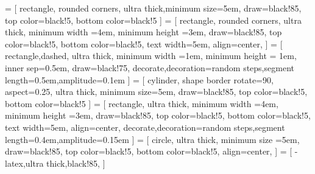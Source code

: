 \documentclass[utf8x,14pt]{extarticle}
\begin{document}
\sf\normalsize
{} = [
    rectangle, rounded corners,
    ultra thick,minimum size=5em,
    draw=black!85,
    top color=black!5,
    bottom color=black!5
]
 = [
    rectangle, rounded corners,
    ultra thick,
    minimum width =4em,
    minimum height =3em,
    draw=black!85,
    top color=black!5,
    bottom color=black!5,
    text width=5em,
    align=center,
]
 = [
    rectangle,dashed,
    ultra thick,
    minimum width =1em,
    minimum height = 1em,
    inner sep=0.5em,
    draw=black!75,
    decorate,decoration={random steps,segment length=0.5em,amplitude=0.1em}
]
 = [
    cylinder,  shape border rotate=90,
    aspect=0.25,
    ultra thick,
    minimum size=5em,
    draw=black!85,
    top color=black!5,
    bottom color=black!5
]
 = [
    rectangle,
    ultra thick,
    minimum width =4em,
    minimum height =3em,
    draw=black!85,
    top color=black!5,
    bottom color=black!5,
    text width=5em,
    align=center,
    decorate,decoration={random steps,segment length=0.4em,amplitude=0.15em}
]
 = [
    circle,
    ultra thick,
    minimum size =5em,
    draw=black!85,
    top color=black!5,
    bottom color=black!5,
    align=center,
]
 = [
    -latex,ultra thick,black!85,
]
\end{document}
